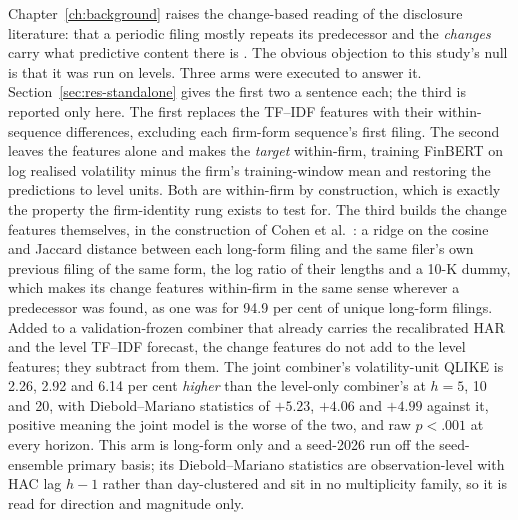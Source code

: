 Chapter~\ref{ch:background} raises the change-based reading of the
disclosure literature: that a periodic filing mostly repeats its
predecessor and the \emph{changes} carry what predictive content there is
\cite{cohen2020lazy}. The obvious objection to this study's null is
that it was run on levels. Three arms were executed to answer it.
Section~\ref{sec:res-standalone} gives the first two a sentence each; the
third is reported only here. The first replaces the TF--IDF
features with their within-sequence differences, excluding each firm-form
sequence's first filing. The second leaves the features alone and makes the
\emph{target} within-firm, training FinBERT on log realised volatility
minus the firm's training-window mean and restoring the predictions to
level units. Both are within-firm by construction, which is exactly the
property the firm-identity rung exists to test for.
The third builds the change features themselves, in the construction of
Cohen et al.~\cite{cohen2020lazy}: a ridge on the cosine and Jaccard
distance between each long-form filing and the same filer's own previous
filing of the same form, the log ratio of their lengths and a 10-K dummy,
which makes its change features within-firm in the same sense wherever a
predecessor was found, as one was for 94.9 per cent of unique long-form
filings. %
Added to a validation-frozen combiner that already carries the
recalibrated HAR and the level TF--IDF forecast, the change features do
not add to the level features; they subtract from them. The joint
combiner's volatility-unit QLIKE is 2.26, 2.92 and 6.14 per cent
\emph{higher} than the level-only combiner's at $h{=}5$, 10 and 20, with
Diebold--Mariano statistics of $+5.23$, $+4.06$ and $+4.99$ against it,
positive meaning the joint model is the worse of the two, and raw
$p<.001$ at every horizon. %
This arm is long-form only and a seed-2026 run off the seed-ensemble
primary basis; its Diebold--Mariano statistics are observation-level with
HAC lag $h-1$ rather than day-clustered and sit in no multiplicity family,
so it is read for direction and magnitude only.

